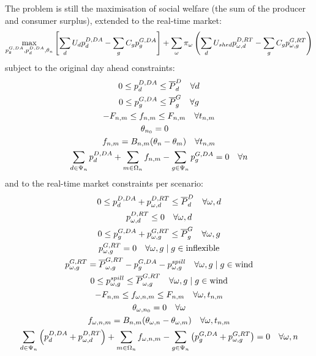\documentclass[11pt,a4paper]{article}
\numberwithin{equation}{section}
\begin{document}
The problem is still the maximisation of social welfare (the sum of the producer and consumer surplus), extended to the real-time market:
\begin{equation}
\max_{p^{G,DA}_g,p^{D,DA}_d,\theta_n} \left[ \sum_d U_d p^{D,DA}_d - \sum_g C_g p^{G,DA}_g \right] + 
\sum_\omega \pi_\omega \left( \sum_d U_{shed} p^{D,RT}_{\omega,d} - \sum_g C_g p^{G,RT}_{\omega,g} \right)
\end{equation}
subject to the original day ahead constraints:
\begin{gather}
0 \leq p^{D,DA}_d \leq \overline{P}^D_d \quad \forall d \label{eq:da_demand} \\
0 \leq p^{G,DA}_g \leq \overline{P}^G_g \quad \forall g \label{eq:da_supply} \\
-F_{n,m}  \leq f_{n,m} \leq F_{n,m} \quad \forall t_{n,m} \label{eq:da_trans}\\
\theta_{n_0} = 0 \quad \label{eq:prim_ref_theta} \\
f_{n,m} = B_{n,m}(\theta_n - \theta_m) \quad \forall t_{n,m} \label{eq:da_flow} \\
\sum_{d \in \Psi_n} p^{D,DA}_d + \sum_{m \in \Omega_n} f_{n,m} - \sum_{g \in \Psi_n} p^{G,DA}_g = 0 \quad \forall n \label{eq:da_balance}
\end{gather}
and to the real-time market constraints per scenario:
\begin{gather}
0 \leq p^{D,DA}_d + p^{D,RT}_{\omega,d} \leq \overline{P}^D_d \quad \forall \omega, d \label{eq:rt_demand} \\
p^{D,RT}_{\omega,d} \leq 0 \quad \forall \omega, d \\
0 \leq p^{G,DA}_g + p^{G,RT}_{\omega,g} \leq \overline{P}^G_g \quad \forall \omega, g \label{eq:rt_supply} \\
p^{G,RT}_{\omega,g} = 0 \quad \forall \omega, g \mid g \in \text{inflexible} \\
p^{G,RT}_{\omega,g} = \overline{P}^{G,RT}_{\omega,g} - p^{G,DA}_g - p^{spill}_{\omega,g}  \quad \forall \omega, g \mid g \in \text{wind} \label{eq:rt_wind} \\
0  \leq p^{spill}_{\omega,g} \leq \overline{P}^{G,RT}_{\omega,g} \quad \forall \omega, g \mid g \in \text{wind} \\
-F_{n,m}  \leq f_{\omega,n,m} \leq F_{n,m} \quad \forall \omega, t_{n,m} \label{eq:rt_trans}\\
\theta_{\omega, n_0} = 0 \quad \forall \omega \label{eq:prim_ref_theta} \\
f_{\omega,n,m} = B_{n,m}(\theta_{\omega, n} - \theta_{\omega, m}) \quad \forall \omega, t_{n,m} \label{eq:rt_flow} \\
\sum_{d \in \Psi_n} \left( p^{D,DA}_d + p^{D,RT}_{\omega,d} \right) + \sum_{m \in \Omega_n} f_{\omega,n,m} 
- \sum_{g \in \Psi_n} \left( p^{G,DA}_g + p^{G,RT}_{\omega,g} \right) = 0 \quad \forall \omega, n \label{eq:rt_balance}
\end{gather}
\end{document}
